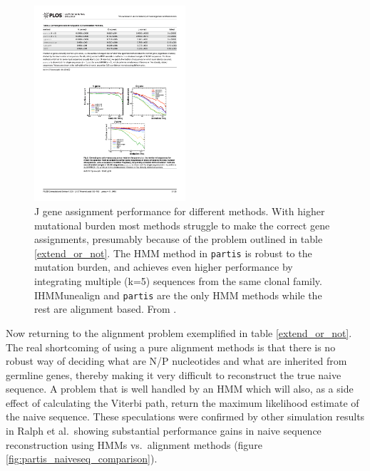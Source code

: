 \begin{figure}
    \centering
    \includegraphics[width=0.5\textwidth]{figures/partis_Jgene_comparison.pdf}
    \caption{
        \label{fig:partis_Jgene_comparison}
        J gene assignment performance for different methods.
        With higher mutational burden most methods struggle to make the correct gene assignments, presumably because of the problem outlined in table \ref{extend_or_not}.
        The HMM method in \texttt{partis} is robust to the mutation burden, and achieves even higher performance by integrating multiple (k=5) sequences from the same clonal family.
        IHMMunealign and \texttt{partis} are the only HMM methods while the rest are alignment based.
        From \cite{ralph2016consistency}.
    }
\end{figure}


Now returning to the alignment problem exemplified in table \ref{extend_or_not}.
The real shortcoming of using a pure alignment methods is that there is no robust way of deciding what are N/P nucleotides and what are inherited from germline genes, thereby making it very difficult to reconstruct the true naive sequence.
A problem that is well handled by an HMM which will also, as a side effect of calculating the Viterbi path, return the maximum likelihood estimate of the naive sequence.
These speculations were confirmed by other simulation results in Ralph et al.\ showing substantial performance gains in naive sequence reconstruction using HMMs vs.\ alignment methods (figure \ref{fig:partis_naiveseq_comparison}).

